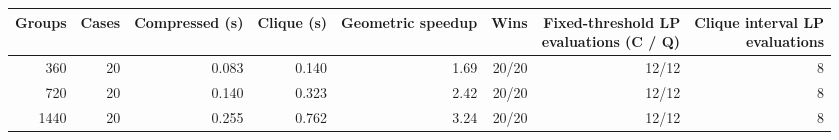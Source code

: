 \begin{tabular}{rrrrrrrr}
\toprule
Groups & Cases & Compressed (s) & Clique (s) & Geometric speedup & Wins & \shortstack{Fixed-threshold LP\\evaluations (C / Q)} & \shortstack{Clique interval LP\\evaluations} \\
\midrule
360 & 20 & 0.083 & 0.140 & 1.69 & 20/20 & 12/12 & 8 \\
720 & 20 & 0.140 & 0.323 & 2.42 & 20/20 & 12/12 & 8 \\
1440 & 20 & 0.255 & 0.762 & 3.24 & 20/20 & 12/12 & 8 \\
\bottomrule
\end{tabular}
